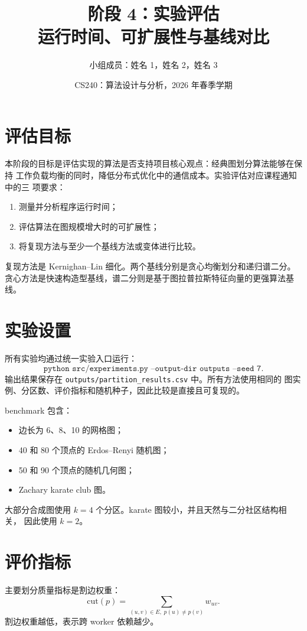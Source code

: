\documentclass[UTF8, 11pt]{ctexart}
\title{\textbf{阶段 4：实验评估}\\
运行时间、可扩展性与基线对比}
\author{小组成员：姓名 1，姓名 2，姓名 3}
\date{CS240：算法设计与分析，2026 年春季学期}
\begin{document}
\maketitle

\section{评估目标}

本阶段的目标是评估实现的算法是否支持项目核心观点：经典图划分算法能够在保持
工作负载均衡的同时，降低分布式优化中的通信成本。实验评估对应课程通知中的三
项要求：
\begin{enumerate}
    \item 测量并分析程序运行时间；
    \item 评估算法在图规模增大时的可扩展性；
    \item 将复现方法与至少一个基线方法或变体进行比较。
\end{enumerate}

复现方法是 Kernighan--Lin 细化。两个基线分别是贪心均衡划分和递归谱二分。
贪心方法是快速构造型基线，谱二分则是基于图拉普拉斯特征向量的更强算法基线。

\section{实验设置}

所有实验均通过统一实验入口运行：
\[
\texttt{python src/experiments.py --output-dir outputs --seed 7}.
\]
输出结果保存在 \texttt{outputs/partition\_results.csv} 中。所有方法使用相同的
图实例、分区数、评价指标和随机种子，因此比较是直接且可复现的。

benchmark 包含：
\begin{itemize}
    \item 边长为 6、8、10 的网格图；
    \item 40 和 80 个顶点的 Erdos--Renyi 随机图；
    \item 50 和 90 个顶点的随机几何图；
    \item Zachary karate club 图。
\end{itemize}

大部分合成图使用 $k=4$ 个分区。karate 图较小，并且天然与二分社区结构相关，
因此使用 $k=2$。

\section{评价指标}

主要划分质量指标是割边权重：
\[
    \mathrm{cut}(p)
    =
    \sum_{(u,v)\in E,\;p(u)\neq p(v)} w_{uv}.
\]
割边权重越低，表示跨 worker 依赖越少。
\end{document}
